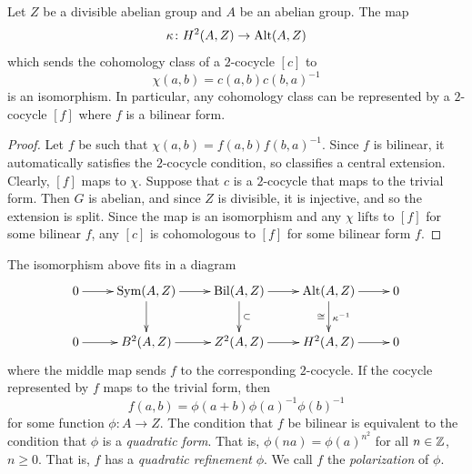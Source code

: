 \documentclass[11pt]{amsart}
\begin{document}
\begin{prop}
Let $Z$ be a divisible abelian group and $A$ be an abelian group.
The map
\[ \kappa \colon H^2(A,Z) \to \mathrm{Alt}(A, Z) \]
which sends the cohomology class of a $2$-cocycle $[c]$ to
\[\chi(a,b) = c(a,b) c(b,a)^{-1}\]
is an isomorphism. In particular, any cohomology class can be represented by a $2$-cocycle $[f]$ where  $f$ is a bilinear form.
\end{prop}
\begin{proof}
Let $f$ be such that $\chi(a,b) = f(a,b) f(b,a)^{-1}$. Since $f$ is bilinear, it automatically satisfies the $2$-cocycle condition, so classifies a central extension. Clearly, $[f]$ maps to $\chi$.  Suppose that $c$ is a $2$-cocycle that maps to the trivial form. Then $G$ is abelian, and since $Z$ is divisible, it is injective, and so the extension is split. Since the map is an isomorphism and any $\chi$ lifts to $[f]$ for some bilinear $f$, any $[c]$ is cohomologous to $[f]$ for some bilinear form $f$.
\end{proof}


The isomorphism above fits in a diagram
\[\xymatrix{
0\ar[r] & \Sym(A,Z) \ar[d] \ar[r] & \Bil(A,Z) \ar[d]^-{\subset} \ar[r] &  \Alt(A, Z) \ar[r]\ar[d]^-{\kappa^{-1}}_-\cong & 0 \\
0\ar[r] &B^2(A,Z) \ar[r]   & Z^2(A,Z) \ar[r] &  H^2(A,Z)   \ar[r] & 0
}\]
where the middle map sends $f$ to the corresponding $2$-cocycle.
If the cocycle represented by $f$ maps to the trivial form, then
\[f(a,b)= \phi(a+b)\phi(a)^{-1}\phi(b)^{-1}\]
for some function $\phi \colon A \to Z$. The condition that $f$ be bilinear is equivalent to the condition that $\phi$ is a \emph{quadratic form}. That is, $\phi(na) = \phi(a)^{n^2}$ for all $n\in \mathbb{Z}$, $n\geq 0$. That is, $f$ has a \emph{quadratic refinement} $\phi$. We call $f$ the \emph{polarization} of $\phi$.
\end{document}
